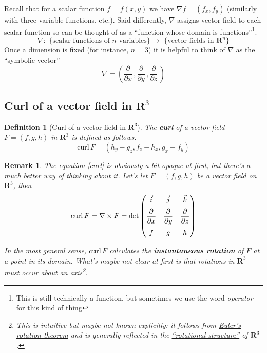 \documentclass[12pt]{article}
\numberwithin{equation}{subsection}
\numberwithin{figure}{subsection}
\newtheorem{defn}[subsection]{Definition}
\theoremstyle{note}
\newtheorem{remark}[subsection]{Remark}
\newcommand{\curl}{\mathrm{curl\,}}
\begin{document}
{Recall that for a scalar function $f=f(x,y)$ we have $\nabla f=(f_x,f_y)$ (similarly with three variable functions, etc.). Said differently, $\nabla$ assigns vector field to each scalar function so can be thought of as a ``function whose domain is functions''\footnote{This is still technically a function, but sometimes we use the word \textit{operator} for this kind of thing}. \[ \nabla \colon \text{ \{scalar functions of $n$ variables\} } \to \text{ \{vector fields in $\mathbf{R}^n$\} } \]
Once a dimension is fixed (for instance, $n=3$) it is helpful to think of  $\nabla$ as the ``symbolic vector'' \begin{equation}\label{grad} \nabla = \left( \dfrac{\partial}{\partial x} \, , \dfrac{\partial}{\partial y}\, , \dfrac{\partial}{\partial z}\, \right) \end{equation} 

\subsection{Curl of a vector field in $\mathbf{R}^3$}
\begin{defn}[Curl of a vector field in $\mathbf{R}^3$] The \textbf{curl} of a vector field $F=(f,g,h)$ in $\mathbf{R}^3$ is defined as follows. 
\begin{equation} \label{curl} \curl F = ( h_y-g_z, f_z-h_x, g_x-f_y)\end{equation}
\end{defn}

\begin{remark}
	The equation \eqref{curl} is obviously a bit opaque at first, but there's a much better way of thinking about it. Let's let $F=(f,g,h)$ be a vector field on $\mathbf{R}^3$, then \begin{equation}
		\curl F= \nabla \times F = \det \begin{pmatrix} \vspace{2mm} \vec{i} & \vec{j} & \vec{k} \\ \vspace{2mm} \dfrac{\partial}{\partial x} & \dfrac{\partial}{\partial y}  &\dfrac{\partial}{\partial z} \\ f & g & h\end{pmatrix}
	\end{equation}


 In the most general sense, $\curl F$ calculates the \textbf{instantaneous rotation} of $F$ at a point in its domain. What's maybe not clear at first is that rotations in $\mathbf{R}^3$ must occur about an axis\footnote{This is intuitive but maybe not known explicitly: it follows from \href{https://en.wikipedia.org/wiki/Euler\%27s_rotation_theorem}{Euler's rotation theorem} and is generally reflected in the \href{https://en.wikipedia.org/wiki/3D_rotation_group}{``rotational structure''} of $\mathbf{R}^3$.}. 


\end{remark}}
\end{document}
